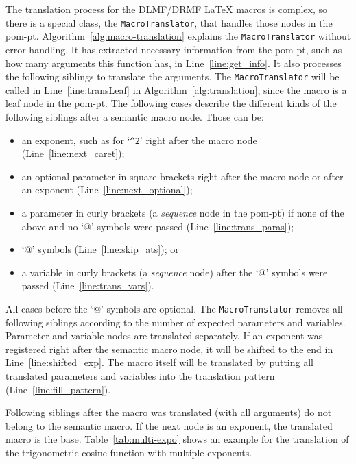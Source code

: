 \documentclass[a4paper,11pt]{article}
\newcommand{\DLMF}{DLMF}
\newcommand{\DRMF}{DRMF}
\newcommand{\Macro}{\DLMF/\DRMF{} \LaTeX{} macro}
\theoremstyle{defTheoStyle}
\theoremstyle{defExampStyle}
\begin{document}
	The translation process for the \Macro s is complex, so there is a special class, the \verb|MacroTranslator|, that handles those nodes in the \gls*{pom-pt}. Algorithm~\ref{alg:macro-translation} explains the \verb|MacroTranslator| without error handling. It has extracted necessary information from the \gls*{pom-pt}, such as how many arguments this function has, in Line~\ref{line:get_info}. It also processes the following siblings to translate the arguments. The \verb|MacroTranslator| will be called in Line~\ref{line:transLeaf} in Algorithm~\ref{alg:translation}, since the macro is a leaf node in the \gls*{pom-pt}. The following cases describe the different kinds of the following siblings after a semantic macro node. Those can be:
	\begin{itemize}
		\item an exponent, such as for `\verb|^2|' right after the macro node (Line~\ref{line:next_caret});
		\item an optional parameter in square brackets right after the macro node or after an exponent (Line~\ref{line:next_optional});
		\item a parameter in curly brackets (a \textit{sequence} node in the \gls*{pom-pt}) if none of the above and no `$@$' symbols were passed (Line~\ref{line:trans_paras});
		\item `$@$' symbols (Line~\ref{line:skip_ats}); or
		\item a variable in curly brackets (a \textit{sequence} node) after the `$@$' symbols were 
		passed (Line~\ref{line:trans_vars}).
	\end{itemize}
	
	All cases before the `$@$' symbols are optional. The \verb|MacroTranslator| removes all following siblings according to the number of expected parameters and variables. Parameter and variable nodes are translated separately. If an exponent was registered right after the semantic macro node, it will be shifted to the end in Line~\ref{line:shifted_exp}. The macro itself will be translated by putting all translated parameters and variables into the translation pattern (Line~\ref{line:fill_pattern}).
	
	Following siblings after the macro was translated (with all arguments) do not belong to the semantic macro. If the next node is an exponent, the translated macro is the base. Table~\ref{tab:multi-expo} shows an example for the translation of the trigonometric cosine function with multiple exponents.
	
\end{document}
